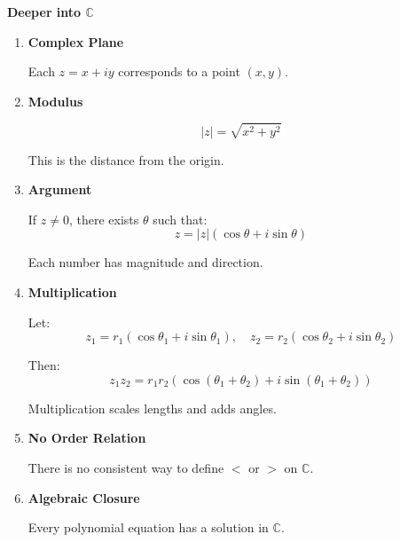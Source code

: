 \documentclass[11pt]{article}
\newcommand{\C}{\mathbb{C}}
\begin{document}
\begin{theorybox}

\textbf{Deeper into $\C$}

\begin{enumerate}

\item \textbf{Complex Plane}

Each $z = x+iy$ corresponds to a point $(x,y)$.

\item \textbf{Modulus}

\[
|z| = \sqrt{x^2 + y^2}
\]

This is the distance from the origin.

\item \textbf{Argument}

If $z \neq 0$, there exists $\theta$ such that:
\[
z = |z|(\cos\theta + i\sin\theta)
\]

Each number has magnitude and direction.

\item \textbf{Multiplication}

Let:
\[
z_1 = r_1(\cos\theta_1 + i\sin\theta_1), \quad
z_2 = r_2(\cos\theta_2 + i\sin\theta_2)
\]

Then:
\[
z_1 z_2 = r_1 r_2 (\cos(\theta_1+\theta_2) + i\sin(\theta_1+\theta_2))
\]

Multiplication scales lengths and adds angles.

\item \textbf{No Order Relation}

There is no consistent way to define $<$ or $>$ on $\C$.

\item \textbf{Algebraic Closure}

Every polynomial equation has a solution in $\C$.

\end{enumerate}

\end{theorybox}

\begin{center}
\end{center}
\end{document}
